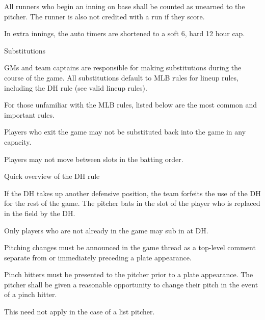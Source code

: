 \begin{deepEnumerate}
\begin{deepEnumerate}
\begin{deepEnumerate}
\begin{center}
			\end{center}
			\item All runners who begin an inning on base shall be counted as unearned to the pitcher. 
			The runner is also not credited with a run if they score.
			\item In extra innings, the auto timers are shortened to a soft 6, hard 12 hour cap.
		\end{deepEnumerate}
	\end{deepEnumerate}
	\item Substitutions
	\label{sec:substitutions}
	\begin{deepEnumerate}
		\item GMs and team captains are responsible for making substitutions during the course of the game.
		All substitutions default to MLB rules for lineup rules, including the DH rule (see valid lineup rules).
		\begin{deepEnumerate}
			\item For those unfamiliar with the MLB rules, listed below are the most common and important rules.
			\begin{deepEnumerate}
				\item Players who exit the game may not be substituted back into the game in any capacity.
				\item Players may not move between slots in the batting order.
				\item Quick overview of the DH rule
				\begin{deepEnumerate}
					\item If the DH takes up another defensive position, the team forfeits the use of the DH for the rest of the game. 
					The pitcher bats in the slot of the player who is replaced in the field by the DH.
					\item Only players who are not already in the game may sub in at DH.
				\end{deepEnumerate}
			\end{deepEnumerate}
		\end{deepEnumerate}
		\item Pitching changes must be announced in the game thread as a top-level comment separate from or immediately preceding a plate appearance.
		\item Pinch hitters must be presented to the pitcher prior to a plate appearance. 
		The pitcher shall be given a reasonable opportunity to change their pitch in the event of a pinch hitter.
		\begin{deepEnumerate}
			\item This need not apply in the case of a list pitcher. 

\end{deepEnumerate}
\end{deepEnumerate}
\end{deepEnumerate}
